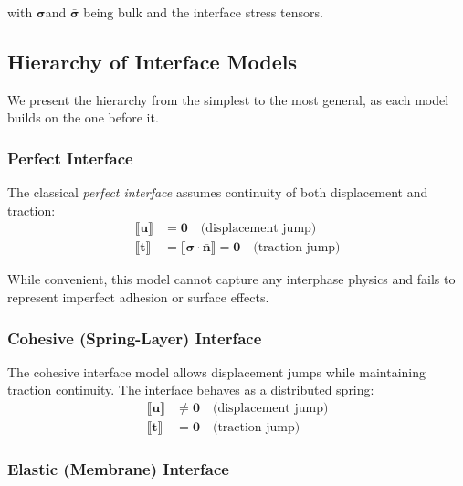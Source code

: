 \documentclass[oneside, 12pt, a4paper, bibliography=totoc]{book}
\newcommand{\jump}[1]{\llbracket #1 \rrbracket}    %
\newcommand{\bs}[1]{\bm{#1}}                       %
\begin{document}
with  $\bs{\sigma}$and $\bar{\bs{\sigma}}$ being bulk and the interface stress tensors.

\subsection{Hierarchy of Interface Models}
\label{subsec:interface_hierarchy}

We present the hierarchy from the simplest to the most general, as each model builds on the one before it.

\subsubsection{Perfect Interface}
\label{subsec:perfect_interface}

The classical \textit{perfect interface} assumes continuity of both displacement and traction:
%
\begin{align}
    \jump{\bs{u}} &= \bs{0} \quad \text{(displacement jump)} \label{eq:perfect_disp}\\
    \jump{\bs{t}} &= \jump{\bs{\sigma} \cdot \bs{\bar{n}}} = \bs{0} \quad \text{(traction jump)}\label{eq:perfect_trac}
\end{align}

While convenient, this model cannot capture any interphase physics and fails to represent imperfect adhesion or surface effects.

\subsubsection{Cohesive (Spring-Layer) Interface}
\label{subsec:cohesive_interface}

The cohesive interface model allows displacement jumps while maintaining traction continuity. The interface behaves as a distributed spring:
%
\begin{align}
    \jump{\bs{u}} &\neq \bs{0} \quad \text{(displacement jump)} \label{eq:cohesive_disp}\\
    \jump{\bs{t}} &= \bs{0} \quad \text{(traction jump)} \label{eq:cohesive_trac}
\end{align}
%

\subsubsection{Elastic (Membrane) Interface}
\label{subsec:elastic_interface}
\end{document}

